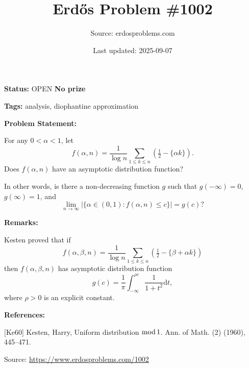 \documentclass{article}
\title{Erd\H{o}s Problem \#1002}
\date{Last updated: 2025-09-07}
\author{Source: erdosproblems.com}
\begin{document}
\maketitle

\noindent\textbf{Status:} OPEN \quad \textbf{No prize}

\noindent\textbf{Tags:} analysis, diophantine approximation

\medskip
\noindent\textbf{Problem Statement:}

For any $0<\alpha<1$, let\[f(\alpha,n)=\frac{1}{\log n}\sum_{1\leq k\leq n}(\tfrac{1}{2}-\{ \alpha k\}).\]Does $f(\alpha,n)$ have an asymptotic distribution function?

In other words, is there a non-decreasing function $g$ such that $g(-\infty)=0$, $g(\infty)=1$,
and\[\lim_{n\to \infty}\lvert \{ \alpha\in (0,1): f(\alpha,n)\leq c\}\rvert=g(c)?\]

\bigskip
\noindent\textbf{Remarks:}

Kesten \cite{Ke60} proved that if\[f(\alpha,\beta,n)=\frac{1}{\log n}\sum_{1\leq k\leq n}(\tfrac{1}{2}-\{\beta+\alpha k\})\]then $f(\alpha,\beta,n)$ has asymptotic distribution function\[g(c)=\frac{1}{\pi}\int_{-\infty}^{\rho c}\frac{1}{1+t^2}\mathrm{d}t,\]where $\rho>0$ is an explicit constant.

\bigskip
\noindent\textbf{References:}

[Ke60] Kesten, Harry, Uniform distribution {${\rm mod}\,1$}. Ann. of Math. (2) (1960), 445--471.

\bigskip
\noindent\small{Source: \url{https://www.erdosproblems.com/1002}}
\end{document}
